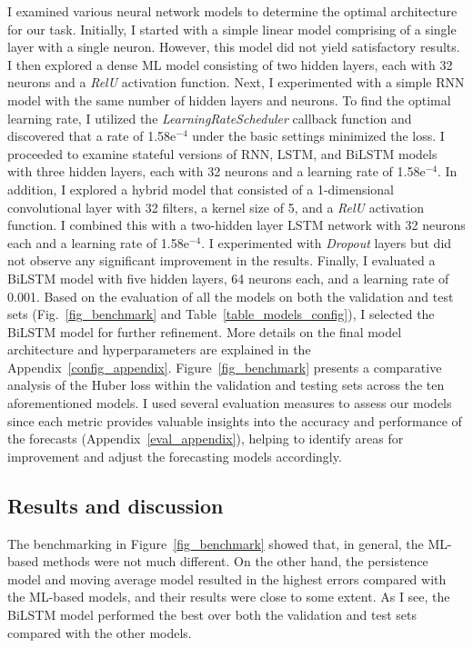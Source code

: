 I examined various neural network models to determine the optimal architecture for our task.
Initially, I started with a simple linear model comprising of a single layer with a single neuron. However, this model did not yield satisfactory results.
I then explored a dense ML model consisting of two hidden layers, each with 32 neurons and a \textit{RelU} activation function. Next, I experimented with a simple RNN model with the same number of hidden layers and neurons.
To find the optimal learning rate, I utilized the \textit{LearningRateScheduler} callback function and discovered that a rate of 1.58e$^{-4}$ under the basic settings minimized the loss.
I proceeded to examine stateful versions of RNN, LSTM, and BiLSTM models with three hidden layers, each with 32 neurons and a learning rate of 1.58e$^{-4}$.
In addition, I explored a hybrid model that consisted of a 1-dimensional convolutional layer with 32 filters, a kernel size of 5, and a \textit{RelU} activation function. I combined this with a two-hidden layer LSTM network with 32 neurons each and a learning rate of 1.58e$^{-4}$. I experimented with \textit{Dropout} layers but did not observe any significant improvement in the results.
Finally, I evaluated a BiLSTM model with five hidden layers, 64 neurons each, and a learning rate of 0.001.
Based on the evaluation of all the models on both the validation and test sets (Fig.~\ref{fig_benchmark} and Table~\ref{table_models_config}), I selected the BiLSTM model for further refinement. More details on the final model architecture and hyperparameters are explained in the Appendix~\ref{config_appendix}.
Figure~\ref{fig_benchmark} presents a comparative analysis of the Huber loss within the validation and testing sets across the ten aforementioned models.
I used several evaluation measures to assess our models since each metric provides valuable insights into the accuracy and performance of the forecasts (Appendix~\ref{eval_appendix}), helping to identify areas for improvement and adjust the forecasting models accordingly.

\subsection{Results and discussion}
The benchmarking in Figure~\ref{fig_benchmark} showed that, in general, the ML-based methods were not much different. On the other hand, the persistence model and moving average model resulted in the highest errors compared with the ML-based models, and their results were close to some extent. 
As I see, the BiLSTM model performed the best over both the validation and test sets compared with the other models.

